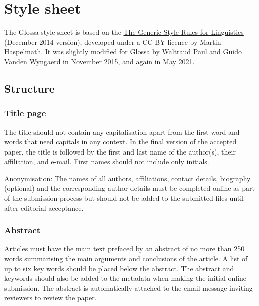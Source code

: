 \documentclass[cm,linguex]{glossa}
\begin{document}
\hypertarget{ss}{%
\section{Style sheet}\label{ss}}

The Glossa style sheet is based on the
\href{http://www.eva.mpg.de/linguistics/past-research-resources/resources/generic-style-rules.html}{The
Generic Style Rules for Linguistics} (December 2014 version), developed
under a CC-BY licence by Martin Haspelmath. It was slightly modified for
Glossa by Waltraud Paul and Guido Vanden Wyngaerd in November 2015, and
again in May 2021.

\hypertarget{structure}{%
\subsection{Structure}\label{structure}}

\hypertarget{title-page}{%
\subsubsection{Title page}\label{title-page}}

The title should not contain any capitalisation apart from the first
word and words that need capitals in any context. In the final version
of the accepted paper, the title is followed by the first and last name
of the author(s), their affiliation, and e-mail. First names should not
include only initials.

Anonymisation: The names of all authors, affiliations, contact details,
biography (optional) and the corresponding author details must be
completed online as part of the submission process but should not be
added to the submitted files until after editorial acceptance.

\hypertarget{abstract}{%
\subsubsection{Abstract}\label{abstract}}

Articles must have the main text prefaced by an abstract of no more than
250 words summarising the main arguments and conclusions of the article.
A list of up to six key words should be placed below the abstract. The
abstract and keywords should also be added to the metadata when making
the initial online submission. The abstract is automatically attached to
the email message inviting reviewers to review the paper.
\end{document}
